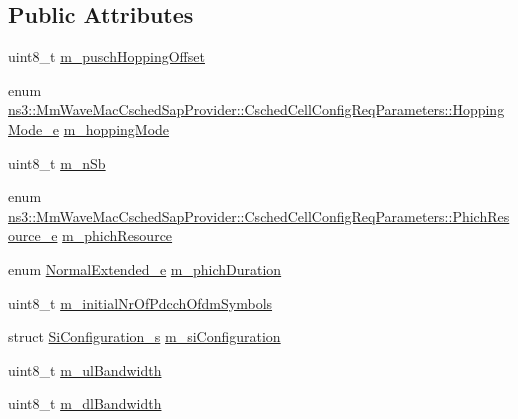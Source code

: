 \subsection*{Public Attributes}
\begin{DoxyCompactItemize}
\item 
uint8\+\_\+t \hyperlink{structns3_1_1MmWaveMacCschedSapProvider_1_1CschedCellConfigReqParameters_a32e5829a7a0d6968005d3902729b5f65}{m\+\_\+pusch\+Hopping\+Offset}
\item 
enum \hyperlink{structns3_1_1MmWaveMacCschedSapProvider_1_1CschedCellConfigReqParameters_aa508b40fe01a84f6122f7c0840954101}{ns3\+::\+Mm\+Wave\+Mac\+Csched\+Sap\+Provider\+::\+Csched\+Cell\+Config\+Req\+Parameters\+::\+Hopping\+Mode\+\_\+e} \hyperlink{structns3_1_1MmWaveMacCschedSapProvider_1_1CschedCellConfigReqParameters_ada0fbe4fe86ebdabe7397c47a5edd0c8}{m\+\_\+hopping\+Mode}
\item 
uint8\+\_\+t \hyperlink{structns3_1_1MmWaveMacCschedSapProvider_1_1CschedCellConfigReqParameters_ad38abf81cd7f13dd0a33635564520bdc}{m\+\_\+n\+Sb}
\item 
enum \hyperlink{structns3_1_1MmWaveMacCschedSapProvider_1_1CschedCellConfigReqParameters_a7053374e9342659839908f7536df614a}{ns3\+::\+Mm\+Wave\+Mac\+Csched\+Sap\+Provider\+::\+Csched\+Cell\+Config\+Req\+Parameters\+::\+Phich\+Resource\+\_\+e} \hyperlink{structns3_1_1MmWaveMacCschedSapProvider_1_1CschedCellConfigReqParameters_ae169644e00e4cab83756e3b788b1398d}{m\+\_\+phich\+Resource}
\item 
enum \hyperlink{namespacens3_acf4e55ff5777ad2ac5ce429a45c38506}{Normal\+Extended\+\_\+e} \hyperlink{structns3_1_1MmWaveMacCschedSapProvider_1_1CschedCellConfigReqParameters_a0b07d705f6ff6c0a25a97cec3f75118a}{m\+\_\+phich\+Duration}
\item 
uint8\+\_\+t \hyperlink{structns3_1_1MmWaveMacCschedSapProvider_1_1CschedCellConfigReqParameters_a410f2a09f2297d7bdccd44d8ae097cfb}{m\+\_\+initial\+Nr\+Of\+Pdcch\+Ofdm\+Symbols}
\item 
struct \hyperlink{structns3_1_1SiConfiguration__s}{Si\+Configuration\+\_\+s} \hyperlink{structns3_1_1MmWaveMacCschedSapProvider_1_1CschedCellConfigReqParameters_a1a23bcc09e14e27659278fe46665d1d2}{m\+\_\+si\+Configuration}
\item 
uint8\+\_\+t \hyperlink{structns3_1_1MmWaveMacCschedSapProvider_1_1CschedCellConfigReqParameters_a3122d435e43332028365f8d44f0f9309}{m\+\_\+ul\+Bandwidth}
\item 
uint8\+\_\+t \hyperlink{structns3_1_1MmWaveMacCschedSapProvider_1_1CschedCellConfigReqParameters_a130a584afcc807af2d018df0d3419d8c}{m\+\_\+dl\+Bandwidth}

\end{DoxyCompactItemize}
